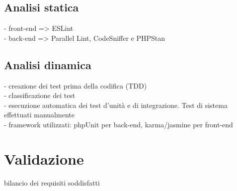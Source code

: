 \subsection{Analisi statica}
- front-end => ESLint\\
- back-end => Parallel Lint, CodeSniffer e PHPStan\\
\subsection{Analisi dinamica}
- creazione dei test prima della codifica (TDD)\\
- classificazione dei test\\
- esecuzione automatica dei test d'unità e di integrazione. Test di sistema effettuati manualmente \\
- framework utilizzati: phpUnit per back-end, karma/jasmine per front-end\\

\section{Validazione}
bilancio dei requisiti soddisfatti\\
